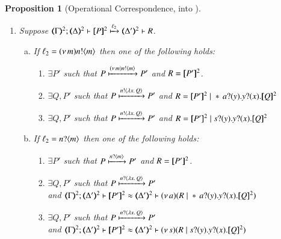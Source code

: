 \documentclass[preprint,11pt]{elsarticle}
\newtheorem{proposition}{Proposition}[section]
\begin{document}
{{\begin{proposition}[Operational Correspondence, \HOp into \sessp]
\begin{enumerate}[1.]
		\item Suppose 
		$\stytra{\mapt{\Gamma}^{2}}{\ell_2}{\mapt{\Delta}^{2}}{\map{P}^{2}}{\mapt{\Delta'}^{2}}{R}$.
			\begin{enumerate}[a)]
				\item %
					If  
					$\ell_2 = (\nu\, m)n ! \langle m \rangle$
					then 
					one of the following holds: 
					\begin{enumerate}[-]
					\item	$\exists P'$ such that $P \xmapsto{(\nu\, m) n !\langle m \rangle} P'$
						and $R = [\!\![P']\!\!]^2$.

					\item	$\exists Q, P'$ such that $P \xmapsto{n !\langle \lambda x.\,Q \rangle} P'$
						and $R = \map{P'}^{2} \Par \repl{} \binp{a}{y} \binp{y}{x} \pmap{Q}{2}$

					\item	$\exists Q, P'$ such that $P \xmapsto{n !\langle \lambda x.\,Q \rangle} P'$
						and $R = \map{P'}^{2} \Par \binp{s}{y} \binp{y}{x} \pmap{Q}{2}$
					\end{enumerate}

				\item   %
					If  $\ell_2 = n ? \langle m \rangle$ 
					then one of the following holds: 
					\begin{enumerate}[-]
					\item	$\exists P'$ such that $P \xmapsto{n ?\langle m \rangle} P'$
						and $R = [\!\![P']\!\!]^2$.

					\item	$\exists Q, P'$ such that
						$P \xmapsto{n ?\langle \lambda x.\,Q \rangle} P'$\\
						and $\horel{\mapt{\Gamma}^{2}}{\mapt{\Delta'}^{2}}{\map{P'}^{2}}{\wb}{\mapt{\Delta'}^{2}}{\news{a}(R \Par \repl{} \binp{a}{y} \binp{y}{x} \pmap{Q}{2})}$
					\item	$\exists Q, P'$ such that
						$P \xmapsto{n ?\langle \lambda x.\,Q \rangle} P'$\\
						and $\horel{\mapt{\Gamma}^{2}}{\mapt{\Delta'}^{2}}{\map{P'}^{2}}{\wb}{\mapt{\Delta'}^{2}}{\news{s}(R \Par \binp{s}{y} \binp{y}{x} \pmap{Q}{2})}$  
					\end{enumerate}
		

\end{enumerate}
\end{enumerate}
\end{proposition}}}
\end{document}
